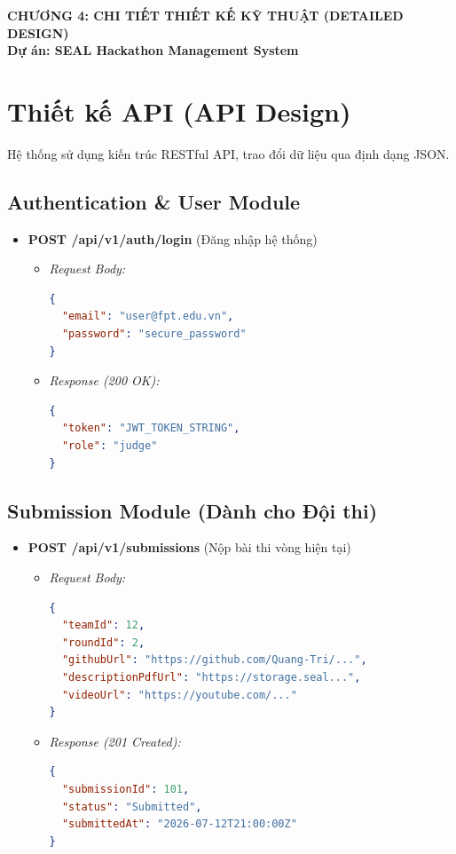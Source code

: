 ﻿\begin{center}
    \LARGE\textbf{CHƯƠNG 4: CHI TIẾT THIẾT KẾ KỸ THUẬT (DETAILED DESIGN)}\\[0.5em]
    \large\textbf{Dự án: SEAL Hackathon Management System}
\end{center}

\section{Thiết kế API (API Design)}
Hệ thống sử dụng kiến trúc RESTful API, trao đổi dữ liệu qua định dạng JSON.

\subsection{Authentication \& User Module}
\begin{itemize}
    \item \textbf{POST /api/v1/auth/login} (Đăng nhập hệ thống)
    \begin{itemize}
        \item \textit{Request Body:}
\begin{lstlisting}[language=json]
{
  "email": "user@fpt.edu.vn",
  "password": "secure_password"
}
\end{lstlisting}
        \item \textit{Response (200 OK):}
\begin{lstlisting}[language=json]
{
  "token": "JWT_TOKEN_STRING",
  "role": "judge"
}
\end{lstlisting}
    \end{itemize}
\end{itemize}

\subsection{Submission Module (Dành cho Đội thi)}
\begin{itemize}
    \item \textbf{POST /api/v1/submissions} (Nộp bài thi vòng hiện tại)
    \begin{itemize}
        \item \textit{Request Body:}
\begin{lstlisting}[language=json]
{
  "teamId": 12,
  "roundId": 2,
  "githubUrl": "https://github.com/Quang-Tri/...",
  "descriptionPdfUrl": "https://storage.seal...",
  "videoUrl": "https://youtube.com/..."
}
\end{lstlisting}
        \item \textit{Response (201 Created):}
\begin{lstlisting}[language=json]
{
  "submissionId": 101,
  "status": "Submitted",
  "submittedAt": "2026-07-12T21:00:00Z"
}
\end{lstlisting}
    \end{itemize}
\end{itemize}

